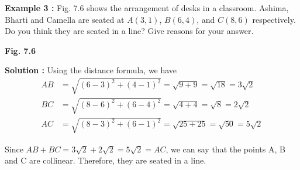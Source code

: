 \documentclass[12pt]{article}
\begin{document}
\vspace{3em}

\noindent\textcolor{ncertblue}{\textbf{Example 3 :}} Fig. 7.6 shows the arrangement of desks in a classroom. Ashima, Bharti and Camella are seated at \( A(3, 1) \), \( B(6, 4) \), and \( C(8, 6) \) respectively. Do you think they are seated in a line? Give reasons for your answer.

\vspace{1em}

\begin{center}

\vspace{0.3em}
\textcolor{ncertblue}{\textbf{Fig. 7.6}}
\end{center}

\vspace{1em}

\noindent\textcolor{ncertblue}{\textbf{Solution :}} Using the distance formula, we have
\[
\begin{aligned}
AB &= \sqrt{(6 - 3)^2 + (4 - 1)^2} = \sqrt{9 + 9} = \sqrt{18} = 3\sqrt{2} \\
BC &= \sqrt{(8 - 6)^2 + (6 - 4)^2} = \sqrt{4 + 4} = \sqrt{8} = 2\sqrt{2} \\
AC &= \sqrt{(8 - 3)^2 + (6 - 1)^2} = \sqrt{25 + 25} = \sqrt{50} = 5\sqrt{2}
\end{aligned}
\]

Since \( AB + BC = 3\sqrt{2} + 2\sqrt{2} = 5\sqrt{2} = AC \), we can say that the points A, B and C are collinear. Therefore, they are seated in a line.
\end{document}

